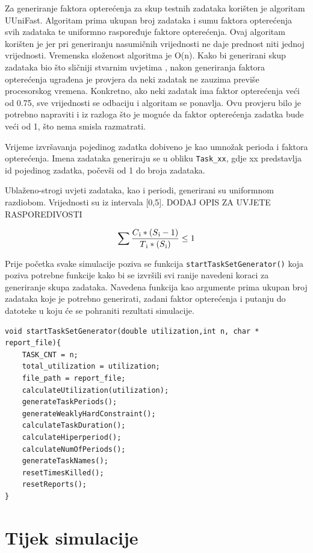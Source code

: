 \documentclass[../zavrsni.tex]{subfiles}
\begin{document}
Za generiranje faktora opterećenja za skup testnih zadataka korišten je algoritam UUniFast. Algoritam prima ukupan broj zadataka 
i sumu faktora opterećenja svih zadataka te uniformno raspoređuje faktore opterećenja. Ovaj algoritam korišten je jer pri generiranju nasumičnih
vrijednosti ne daje prednost niti jednoj vrijednosti. Vremenska složenost algoritma je O(n). Kako bi generirani skup zadataka bio što sličniji stvarnim uvjetima
, nakon generiranja faktora opterećenja ugrađena je provjera da neki zadatak ne zauzima previše procesorskog vremena. Konkretno, ako neki zadatak ima faktor
opterećenja veći od 0.75, sve vrijednosti se odbaciju i algoritam se ponavlja. Ovu provjeru bilo je potrebno napraviti i iz razloga što je moguće da faktor
opterećenja zadatka bude veći od 1, što nema smisla razmatrati.

Vrijeme izvršavanja pojedinog zadatka dobiveno je kao umnožak perioda i faktora opterećenja.
Imena zadataka generiraju se u obliku \texttt{Task\_xx}, gdje xx predstavlja id pojedinog zadatka, počevši od 1 do broja zadataka.

Ublaženo-strogi uvjeti zadataka, kao i periodi, generirani su uniformnom razdiobom. Vrijednosti su iz intervala [0,5]. DODAJ OPIS ZA UVJETE RASPOREDIVOSTI

\begin{equation*}
    \sum\frac{C\textsubscript{i}*(S\textsubscript{i}-1)}{T\textsubscript{i}*(S\textsubscript{i})} \le 1
\end{equation*}

Prije početka svake simulacije poziva se funkcija \texttt{startTaskSetGenerator()} koja poziva potrebne funkcije kako bi se izvršili 
svi ranije navedeni koraci za generiranje skupa zadataka. Navedena funkcija kao argumente prima ukupan broj zadataka koje je potrebno generirati, zadani 
faktor opterećenja i putanju do datoteke u koju će se pohraniti rezultati simulacije.
\begin{lstlisting}[style=CStyle,caption={Funckija startTaskSetGenerator},captionpos=b]
void startTaskSetGenerator(double utilization,int n, char * report_file){
    TASK_CNT = n; 
    total_utilization = utilization; 
    file_path = report_file;
    calculateUtilization(utilization);
    generateTaskPeriods();
    generateWeaklyHardConstraint();
    calculateTaskDuration();
    calculateHiperperiod();
    calculateNumOfPeriods();
    generateTaskNames();
    resetTimesKilled();
    resetReports();
}
\end{lstlisting}
\section{Tijek simulacije}
\end{document}
